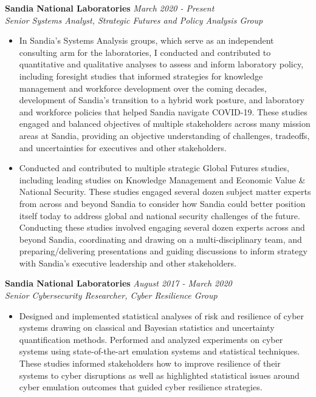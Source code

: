 \documentclass[11pt]{article}
\newenvironment{changemargin}[2]{%
  \begin{list}{}{%
    \setlength{\topsep}{0pt}%
    \setlength{\leftmargin}{#1}%
    \setlength{\rightmargin}{#2}%
    \setlength{\listparindent}{\parindent}%
    \setlength{\itemindent}{\parindent}%
    \setlength{\parsep}{\parskip}%
  }%
  \item[]}{\end{list}
}
\newenvironment{body} {
	\vspace*{-16pt}
	\begin{changemargin}{-0.25in}{-0.5in}
  }	
	{\end{changemargin}
}
\begin{document}
\begin{body}
	\vspace{12pt}
	
	\textbf{Sandia National Laboratories} \hfill \emph{March 2020 - Present}\\
	\emph{Senior Systems Analyst, Strategic Futures and Policy Analysis Group}
	\vspace*{-4pt}
	\begin{itemize}
		\item In Sandia's Systems Analysis groups, which serve as an independent consulting arm for the laboratories, I conducted and contributed to quantitative and qualitative analyses to assess and inform laboratory policy, including foresight studies that informed strategies for knowledge management and workforce development over the coming decades, development of Sandia's transition to a hybrid work posture, and laboratory and workforce policies that helped Sandia navigate COVID-19. These studies engaged and balanced objectives of multiple stakeholders across many mission areas at Sandia, providing an objective understanding of challenges, tradeoffs, and uncertainties for executives and other stakeholders.
		\item Conducted and contributed to multiple strategic Global Futures studies, including leading studies on Knowledge Management and Economic Value \& National Security. These studies engaged several dozen subject matter experts from across and beyond Sandia to consider how Sandia could better position itself today to address global and national security challenges of the future. Conducting these studies involved engaging several dozen experts across and beyond Sandia, coordinating and drawing on a multi-disciplinary team, and preparing/delivering presentations and guiding discussions to inform strategy with Sandia's executive leadership and other stakeholders.
	\end{itemize}	
	
	\textbf{Sandia National Laboratories} \hfill \emph{August 2017 - March 2020}\\
	\emph{Senior Cybersecurity Researcher, Cyber Resilience Group}
	\vspace*{-4pt}
	\begin{itemize}
		\item Designed and implemented statistical analyses of risk and resilience of cyber systems drawing on classical and Bayesian statistics and uncertainty quantification methods. Performed and analyzed experiments on cyber systems using state-of-the-art emulation systems and statistical techniques. These studies informed stakeholders how to improve resilience of their systems to cyber disruptions as well as highlighted statistical issues around cyber emulation outcomes that guided cyber resilience strategies.
	\end{itemize}	
	

\end{body}
\end{document}
